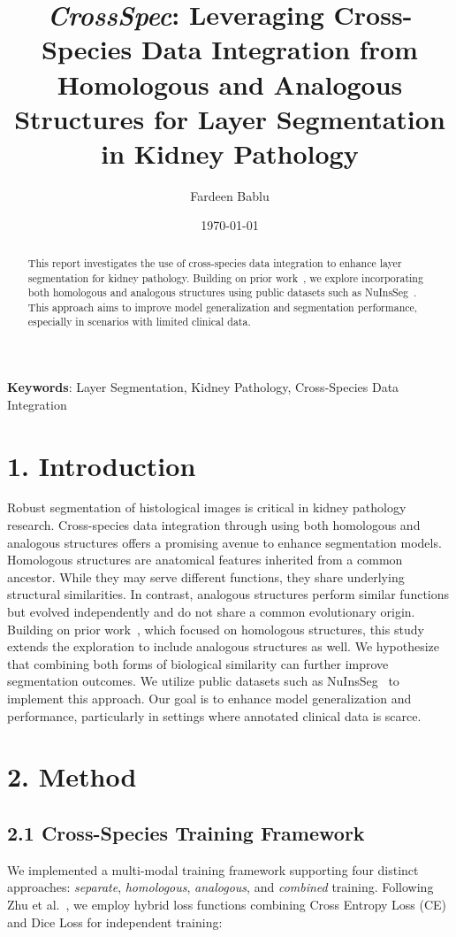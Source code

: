 \documentclass[11pt]{article}
\title{\bfseries\Large \textit{CrossSpec}: Leveraging Cross-Species Data Integration from Homologous and Analogous Structures for Layer Segmentation in Kidney Pathology}
\author[1]{Fardeen Bablu}
\affil[1]{Department of Computer Science, Vanderbilt University, Nashville, TN, USA \\ \texttt{fardeen.e.bablu@vanderbilt.edu}}
\date{\today}
\begin{document}
\maketitle

\begin{abstract}
\noindent
This report investigates the use of cross-species data integration to enhance layer segmentation for kidney pathology. Building on prior work~\cite{zhu2025crossspeciesdataintegrationenhanced}, we explore incorporating both homologous and analogous structures using public datasets such as NuInsSeg~\cite{Mahbod2024}. This approach aims to improve model generalization and segmentation performance, especially in scenarios with limited clinical data.
\end{abstract}

\textbf{Keywords}: Layer Segmentation, Kidney Pathology, Cross-Species Data Integration

\section*{1. Introduction}
\noindent
Robust segmentation of histological images is critical in kidney pathology research. Cross-species data integration through using both homologous and analogous structures offers a promising avenue to enhance segmentation models. Homologous structures are anatomical features inherited from a common ancestor. While they may serve different functions, they share underlying structural similarities. In contrast, analogous structures perform similar functions but evolved independently and do not share a common evolutionary origin. Building on prior work~\cite{zhu2025crossspeciesdataintegrationenhanced}, which focused on homologous structures, this study extends the exploration to include analogous structures as well. We hypothesize that combining both forms of biological similarity can further improve segmentation outcomes. We utilize public datasets such as NuInsSeg~\cite{Mahbod2024} to implement this approach. Our goal is to enhance model generalization and performance, particularly in settings where annotated clinical data is scarce.

\section*{2. Method}

\subsection*{2.1 Cross-Species Training Framework}
\noindent
We implemented a multi-modal training framework supporting four distinct approaches: \textit{separate}, \textit{homologous}, \textit{analogous}, and \textit{combined} training. Following Zhu et al.~\cite{zhu2025crossspeciesdataintegrationenhanced}, we employ hybrid loss functions combining Cross Entropy Loss (CE) and Dice Loss for independent training:
\end{document}
